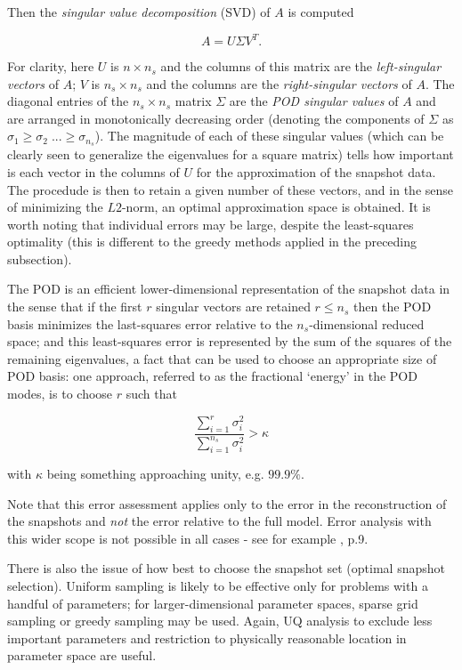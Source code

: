Then the {\it singular value decomposition} (SVD) of $A$ is computed

\begin{equation}
A = U \Sigma V^T.
\end{equation}

For clarity, here $U$ is $n \times n_s$ and the columns of this matrix are the {\it left-singular vectors} of $A$; $V$ is $n_s \times n_s$ and the columns are the {\it right-singular vectors} of $A$.  
The diagonal entries of the $n_s \times n_s$ matrix $\Sigma$ are the {\it POD singular values} of $A$ and are arranged in monotonically decreasing order (denoting the components of $\Sigma$ as $\sigma_1 \geq \sigma_2 \; ... \geq \sigma_{n_s}$).  
The magnitude of each of these singular values (which can be clearly seen to generalize the eigenvalues for a square matrix) tells how important is each vector in the columns of $U$ for the approximation of the snapshot data.  
The procedude is then to retain a given number of these vectors, and in the sense of minimizing the $L2$-norm, an optimal approximation space is obtained.  
It is worth noting that individual errors may be large, despite the least-squares optimality (this is different to the greedy methods applied in the preceding subsection).

The POD is an efficient lower-dimensional representation of the snapshot data in the sense that if the first $r$ singular vectors are retained $r \leq n_s$ then the POD basis minimizes the last-squares error relative to the $n_s$-dimensional reduced space; and this least-squares error is represented by the sum of the squares of the remaining eigenvalues, a fact that can be used to choose an appropriate size of POD basis: one approach, referred to as the fractional `energy' in the POD modes, is to choose $r$ such that 

\begin{equation}
\frac{\sum_{i=1}^r \sigma_i^2}{\sum_{i=1}^{n_s} \sigma_i^2} > \kappa
\end{equation}

with $\kappa$ being something approaching unity, e.g. $99.9\%$.

Note that this error assessment applies only to the error in the reconstruction of the snapshots and {\it not} the error relative to the full model.  
Error analysis with this wider scope is not possible in all cases - see for example \cite{ch17mode}, p.9.

There is also the issue of how best to choose the snapshot set (optimal snapshot selection).  
Uniform sampling is likely to be effective only for problems with a handful of parameters; for larger-dimensional parameter spaces, sparse grid sampling or greedy sampling may be used.  
Again, UQ analysis to exclude less important parameters and restriction to physically reasonable location in parameter space are useful.

